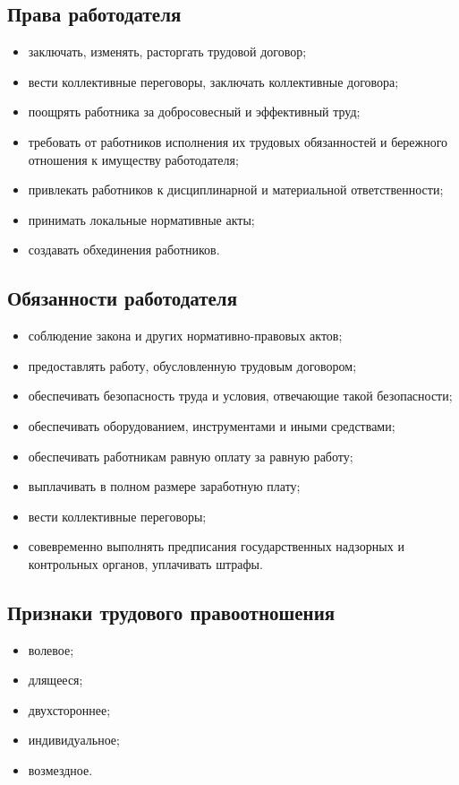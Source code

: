 \documentclass[a5paper,10pt]{article}
\begin{document}
		\subsection{Права работодателя}
			\begin{itemize}[itemsep=0pt]
				\item заключать, изменять, расторгать трудовой договор;
				\item вести коллективные переговоры, заключать коллективные договора;
				\item поощрять работника за добросовесный и эффективный труд;
				\item требовать от работников исполнения их трудовых обязанностей и бережного отношения к имуществу работодателя;
				\item привлекать работников к дисциплинарной и материальной ответственности;
				\item принимать локальные нормативные акты;
				\item создавать обхединения работников.
			\end{itemize}

		\subsection{Обязанности работодателя}
			\begin{itemize}[itemsep=0pt]
				\item соблюдение закона и других нормативно-правовых актов;
				\item предоставлять работу, обусловленную трудовым договором;
				\item обеспечивать безопасность труда и условия, отвечающие такой безопасности;
				\item обеспечивать оборудованием, инструментами и иными средствами;
				\item обеспечивать работникам равную оплату за равную работу;
				\item выплачивать в полном размере заработную плату;
				\item вести коллективные переговоры;
				\item совевременно выполнять предписания государственных надзорных и контрольных органов, уплачивать штрафы.
			\end{itemize}

		\subsection{Признаки трудового правоотношения}
			\begin{itemize}[itemsep=0pt]
				\item волевое;
				\item длящееся;
				\item двухстороннее;
				\item индивидуальное;
				\item возмездное.
			\end{itemize}
\end{document}
